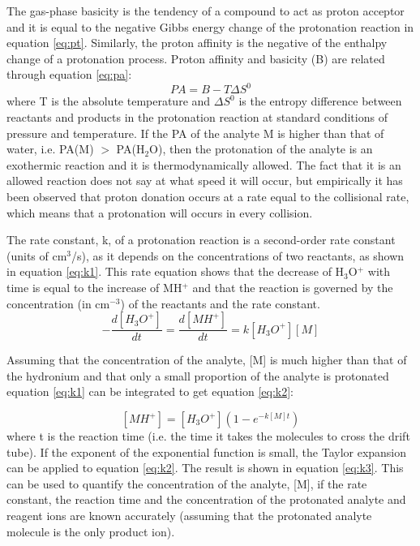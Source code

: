 The gas-phase basicity is the tendency of a compound to act as proton acceptor and it is equal to the negative Gibbs energy change of the protonation reaction in equation \ref{eq:pt}. Similarly, the proton affinity is the negative of the enthalpy change of a protonation process. Proton affinity and basicity (B) are related through equation \ref{eq:pa}:
\begin{equation}
\label{eq:pa}
PA = B - T\Delta S^0
\end{equation}
where T is the absolute temperature and $\Delta S^0$ is the entropy difference between reactants and products in the protonation reaction at standard conditions of pressure and temperature. If the PA of the analyte M is higher than that of water, i.e. PA(M) $>$ PA(H$_2$O), then the protonation of the analyte is an exothermic reaction and it is thermodynamically allowed. The fact that it is an allowed reaction does not say at what speed it will occur, but empirically it has been observed that proton donation occurs at a rate equal to the collisional rate, which means that a protonation will occurs in every collision.

The rate constant, k, of a protonation reaction is a second-order rate constant (units of cm$^3$/s), as it depends on the concentrations of two reactants, as shown in equation \ref{eq:k1}. This rate equation shows that the decrease of H$_3$O$^+$ with time is equal to the increase of MH$^+$ and that the reaction is governed by the concentration (in cm$^{-3}$) of the reactants and the rate constant. 
\begin{equation}
\label{eq:k1}
-\frac{d[H_3 O^+ ]}{dt} = \frac{d[MH^+]}{dt} = k[H_3 O^+ ][M]
\end{equation}

Assuming that the concentration of the analyte, [M] is much higher than that of the hydronium and that only a small proportion of the analyte is protonated equation \ref{eq:k1} can be integrated to get equation \ref{eq:k2}:

\begin{equation}
\label{eq:k2}
[MH^+] = [H_3O^+]\left(1-e^{-k[M]t}\right)
\end{equation}
where t is the reaction time (i.e. the time it takes the molecules to cross the drift tube). If the exponent of the exponential function is small, the Taylor expansion can be applied to equation \ref{eq:k2}.
The result is shown in equation \ref{eq:k3}.  This can be used to quantify the concentration of the analyte, [M], if the rate constant, the reaction time and the concentration of the protonated analyte and reagent ions are known accurately (assuming that the protonated analyte molecule is the only product ion).

